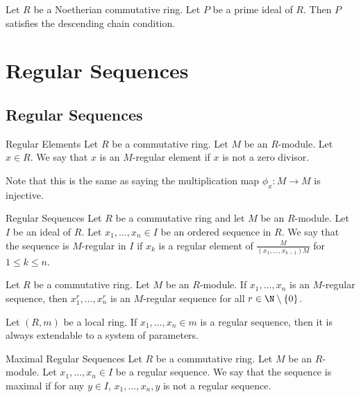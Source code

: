 \documentclass[a4paper]{article}
\begin{document}
\begin{prp}{}{} Let $R$ be a Noetherian commutative ring. Let $P$ be a prime ideal of $R$. Then $P$ satisfies the descending chain condition. 
\end{prp}

\pagebreak
\section{Regular Sequences}
\subsection{Regular Sequences}
\begin{defn}{Regular Elements}{} Let $R$ be a commutative ring. Let $M$ be an $R$-module. Let $x\in R$. We say that $x$ is an $M$-regular element if $x$ is not a zero divisor. 
\end{defn}

Note that this is the same as saying the multiplication map $\phi_x:M\to M$ is injective. 

\begin{defn}{Regular Sequences}{} Let $R$ be a commutative ring and let $M$ be an $R$-module. Let $I$ be an ideal of $R$. Let $x_1,\dots,x_n\in I$ be an ordered sequence in $R$. We say that the sequence is $M$-regular in $I$ if $x_k$ is a regular element of $\frac{M}{(x_1,\dots,x_{k-1})M}$ for $1\leq k\leq n$. 
\end{defn}

\begin{lmm}{}{} Let $R$ be a commutative ring. Let $M$ be an $R$-module. If $x_1,\dots,x_n$ is an $M$-regular sequence, then $x_1^r,\dots,x_n^r$ is an $M$-regular sequence for all $r\in\N\setminus\{0\}$. 
\end{lmm}

\begin{lmm}{}{} Let $(R,m)$ be a local ring. If $x_1,\dots,x_n\in m$ is a regular sequence, then it is always extendable to a system of parameters. 
\end{lmm}

\begin{defn}{Maximal Regular Sequences}{} Let $R$ be a commutative ring. Let $M$ be an $R$-module. Let $x_1,\dots,x_n\in I$ be a regular sequence. We say that the sequence is maximal if for any $y\in I$, $x_1,\dots,x_n,y$ is not a regular sequence. 
\end{defn}
\end{document}
